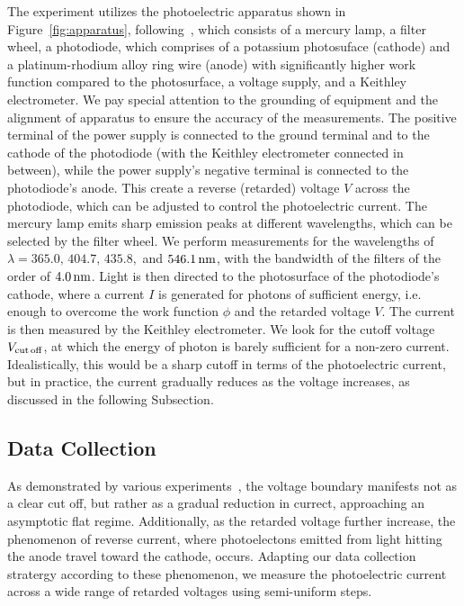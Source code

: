 \documentclass[aps,twocolumn,secnumarabic,balancelastpage,amsmath,amssymb,nofootinbib,floatfix]{revtex4-1}
\newcommand{\nm}{\,{\rm nm}}
\begin{document}
The experiment utilizes the photoelectric apparatus shown in Figure~\ref{fig:apparatus}, following~\citep{MITPhotoelectricEffect}, which consists of a mercury lamp, a filter wheel, a photodiode, which comprises of a potassium photosuface (cathode) and a platinum-rhodium alloy ring wire (anode) with significantly higher work function compared to the photosurface, a voltage supply, and a Keithley electrometer. We pay special attention to the grounding of equipment and the alignment of apparatus to ensure the accuracy of the measurements. The positive terminal of the power supply is connected to the ground terminal and to the cathode of the photodiode (with the Keithley electrometer connected in between), while the power supply's negative terminal is connected to the photodiode's anode. This create a reverse (retarded) voltage $V$ across the photodiode, which can be adjusted to control the photoelectric current. The mercury lamp emits sharp emission peaks at different wavelengths, which can be selected by the filter wheel. We perform measurements for the wavelengths of $\lambda = 365.0, \, 404.7, \, 435.8,$ and $546.1\nm$, with the bandwidth of the filters of the order of $4.0\nm$. Light is then directed to the photosurface of the photodiode's cathode, where a current $I$ is generated for photons of sufficient energy, i.e. enough to overcome the work function $\phi$ and the retarded voltage $V$. The current is then measured by the Keithley electrometer. We look for the cutoff voltage $V_{\rm{cut\,off}}$, at which the energy of photon is barely sufficient for a non-zero current. Idealistically, this would be a sharp cutoff in terms of the photoelectric current, but in practice, the current gradually reduces as the voltage increases, as discussed in the following Subsection.

\subsection{Data Collection}
\label{sec:data_collection}

As demonstrated by various experiments~\citep[e.g.][]{Millikan1916,Quinn1964,Wong2011}, the voltage boundary manifests not as a clear cut off, but rather as a gradual reduction in currect, approaching an asymptotic flat regime. Additionally, as the retarded voltage further increase, the phenomenon of reverse current, where photoelectons emitted from light hitting the anode travel toward the cathode, occurs. Adapting our data collection stratergy according to these phenomenon, we measure the photoelectric current across a wide range of retarded voltages using semi-uniform steps. 
\end{document}
